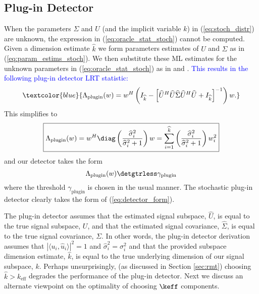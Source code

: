 \subsection{Plug-in Detector}\label{sec:plugin_stoch}
When the parameters $\Sigma$ and $U$ (and the implicit variable $k$) in (\ref{eq:stoch_distr}) are unknown, the expression in (\ref{eq:oracle_stat_stoch}) cannot be computed. Given a dimension estimate $\widehat{k}$ we form parameters estimates of $U$ and $\Sigma$ as in (\ref{eq:param_estims_stoch}). We then substitute these ML estimates for the unknown parameters in (\ref{eq:oracle_stat_stoch}) as in \cite{jin2005cfar} and \cite{mcwhorter2003matched}. \textcolor{blue}{This results in the following plug-in detector LRT statistic:}
\begin{equation*}
\textcolor{blue}{\Lambda_{\text{plugin}}(w)= w^H\left(I_{\widehat{k}}-\left[\widehat{U}^H\widehat{U}\widehat{\Sigma}\widehat{U}^H\widehat{U} + I_{\widehat{k}}\right]^{-1}\right)w.}
\end{equation*}
This simplifies to
\begin{equation}\label{eq:plugin_stat_stoch}
\boxed{\Lambda_{\text{plugin}}(w) = w^H\diag\left(\frac{\widehat{\sigma}^2_i}{\widehat{\sigma}^2_i+1}\right)w=\sum_{i=1}^{\widehat{k}}\left(\frac{\widehat{\sigma}_i^2}{\widehat{\sigma}_i^2+1}\right)w_i^2}
\end{equation}
and our detector takes the form
\begin{equation}\label{eq:plugin_class_stoch}
{\Lambda_{\text{plugin}}(w) \detgtrless \gamma_{\text{plugin}}}
\end{equation}
where the threshold $\gamma_{\text{plugin}}$ is chosen in the usual manner. The stochastic plug-in detector clearly takes the form of (\ref{eq:detector_form}).

The plug-in detector assumes that the estimated signal subspace, $\widehat{U}$, is equal to the true signal subspace, $U$, and that the estimated signal covariance, $\widehat{\Sigma}$, is equal to the true signal covariance, $\Sigma$. In other words,  the plug-in detector derivation assumes that $|\langle u_i,\widehat{u}_i\rangle|^2=1$ and $\widehat{\sigma}_i^2=\sigma_i^2$ and that the provided subspace dimension estimate, $\widehat{k}$, is equal to the true underlying dimension of our signal subspace, $k$. Perhaps unsurprisingly, (as discussed in Section \ref{sec:rmt}) choosing $\widehat{k} > k_\text{eff}$ degrades the performance of the plug-in detector. Next we discuss an alternate viewpoint on the optimality of choosing $\keff$ components.

